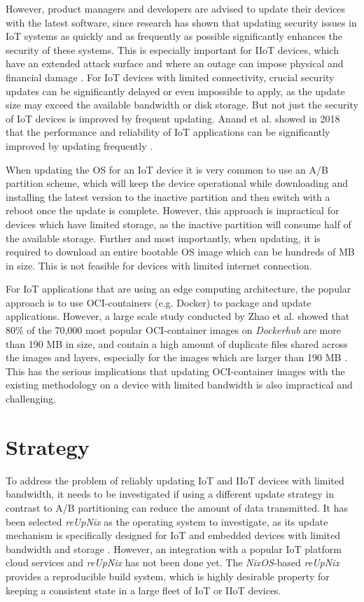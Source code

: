 However, product managers and developers are advised to update their devices with
the latest software, since
research has shown that updating security issues in \ac{IoT} systems as quickly
and as frequently as possible significantly enhances the security of these systems.
This is especially important for \ac{IIoT} devices, which have an extended attack
surface and where an outage can impose physical and financial damage \cite{s20247160}.
For \ac{IoT} devices with limited connectivity, crucial security updates can be
significantly delayed or even impossible to apply, as the update size may exceed
the available bandwidth or disk storage. But not just the security of \ac{IoT}
devices is improved by frequent updating. Anand et al. showed in 2018 that the
performance and reliability of \ac{IoT} applications can be significantly improved
by updating frequently \cite{Anand2018}.

When updating the \ac{OS} for an \ac{IoT} device it is very common to use an
A/B partition scheme, which will keep the device operational while downloading
and installing the latest version to the inactive partition and then switch with
a reboot once the update is complete. However, this approach is impractical for
devices which have limited storage, as the inactive partition will consume
half of the available storage. Further and most importantly, when updating,
it is required to download an entire bootable \ac{OS} image which can be
hundreds of \ac{MB} in size. This is not feasible for devices with limited
internet connection.

For \ac{IoT} applications that are using an edge computing architecture, the popular
approach is to use \ac{OCI}-containers (e.g. Docker) to package and update applications.
However, a large scale study conducted by Zhao et al. showed that 80\% of the
70,000 most popular \ac{OCI}-container images on \textit{Dockerhub} are more than
190 \ac{MB} in size, and contain a high amount of duplicate files shared across the images
and layers, especially for the images which are larger than 190 \ac{MB} \cite{9242268}.
This has the serious implications that updating \ac{OCI}-container images with
the existing methodology on a device with limited bandwidth is also impractical
and challenging.
\clearpage

\section{Strategy}
To address the problem of reliably updating \ac{IoT} and \ac{IIoT}
devices with limited bandwidth, it needs to be investigated if using a different
update strategy in contrast to A/B partitioning can reduce the amount of data transmitted.
It has been selected \textit{reUpNix} as the operating system to investigate, as its
update mechanism is specifically designed for \ac{IoT} and embedded devices with
limited bandwidth and storage \cite{gollenstede:23:lctes}. However, an integration
with a popular \ac{IoT} platform cloud services and \textit{reUpNix} has not
been done yet. The \textit{NixOS}-based \textit{reUpNix} provides a reproducible
build system, which is highly desirable property for keeping a consistent state
in a large fleet of \ac{IoT} or \ac{IIoT} devices.

